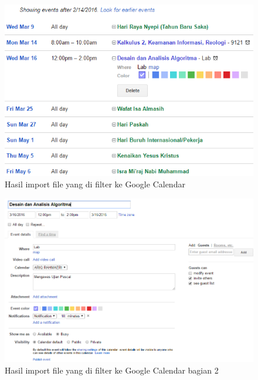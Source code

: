\begin{enumerate}
			\begin{figure}[H]
			\centering
			\includegraphics[scale=0.7]{Gambar/hasilGCFilter}
			\caption{Hasil import file yang di filter ke Google Calendar}
			\label{fig:hasilGCFilter}
			\end{figure}
			
			\begin{figure}[H]
			\centering
			\includegraphics[scale=0.6]{Gambar/hasilGCFilter2}
			\caption{Hasil import file yang di filter ke Google Calendar bagian 2 }
			\label{fig:hasilGCFilter2}
			\end{figure}
			

\end{enumerate}
